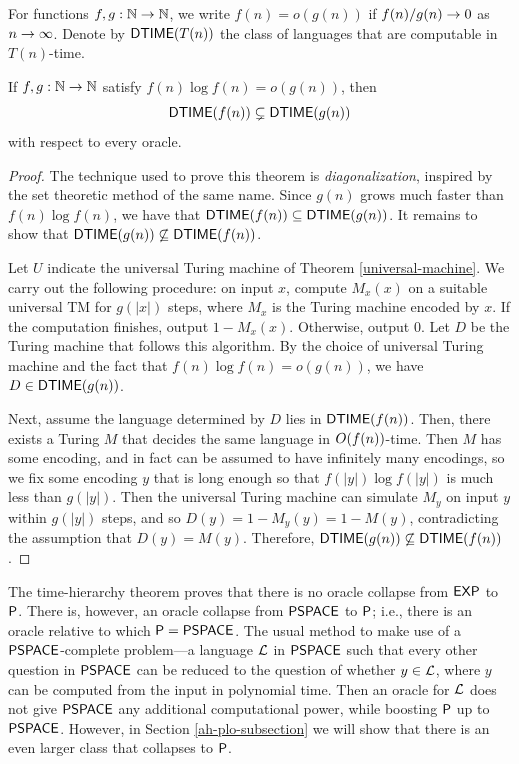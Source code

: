 For functions $f,g:\mathbb{N}\rightarrow\mathbb{N}$, we write $f(n)=o(g(n))$ if $f(n)/g(n)\rightarrow 0$ as 
$n\rightarrow\infty$. Denote by $\mathsf{DTIME}(T(n))$ the class of languages that are 
computable in $T(n)$-time.

\begin{theorem}
If $f,g:\mathbb{N}\rightarrow\mathbb{N}$ satisfy $f(n)\log f(n)=o(g(n))$, then
\[
\mathsf{DTIME}(f(n))\subsetneq\mathsf{DTIME}(g(n))
\]
with respect to every oracle.
\end{theorem}
\begin{proof}
The technique used to prove this theorem is \textit{diagonalization}, inspired by
the set theoretic method of the same name. Since $g(n)$ grows much faster than 
$f(n)\log f(n)$, we have that $\mathsf{DTIME}(f(n))\subseteq\mathsf{DTIME}(g(n))$. It 
remains to show that $\mathsf{DTIME}(g(n))\not\subseteq\mathsf{DTIME}(f(n))$.

Let $U$ indicate the universal Turing machine of Theorem \ref{universal-machine}.
We carry out the following procedure: on input $x$, compute $M_x(x)$ on a 
suitable universal TM for $g(|x|)$ steps, where $M_x$ is the Turing machine 
encoded by $x$. If the computation finishes, output $1-M_x(x)$. Otherwise, output
$0$. Let $D$ be the Turing machine that follows this algorithm. By the choice of 
universal Turing machine and the fact that $f(n)\log f(n)=o(g(n))$, we have 
$D\in\mathsf{DTIME}(g(n))$.

Next, assume the language determined by $D$ lies in  $\mathsf{DTIME}(f(n))$. Then, 
there exists a Turing $M$ that decides the same language in $O(f(n))$-time. Then
$M$ has some encoding, and in fact can be assumed to have infinitely many 
encodings, so we fix some encoding $y$ that is long enough so that $f(|y|)\log 
f(|y|)$ is much less than $g(|y|)$. Then the universal Turing machine can simulate
$M_y$ on input $y$ within $g(|y|)$ steps, and so $D(y)=1-M_y(y)=1-M(y)$, 
contradicting the assumption that $D(y)=M(y)$. Therefore, 
$\mathsf{DTIME}(g(n))\not\subseteq\mathsf{DTIME}(f(n))$.
\end{proof}

The time-hierarchy theorem proves that there is no oracle collapse from 
$\mathsf{EXP}$ to $\mathsf{P}$. There is, however, an oracle collapse from $\mathsf{PSPACE}$ to
$\mathsf{P}$; i.e., there is an oracle relative to which $\mathsf{P}=\mathsf{PSPACE}$. The usual 
method to make use of a $\mathsf{PSPACE}$-complete problem---a language $\mathcal{L}$ in 
$\mathsf{PSPACE}$ such that every other question in $\mathsf{PSPACE}$ can be reduced to 
the question of whether $y\in\mathcal{L}$, where $y$ can be computed from the input in 
polynomial time. Then an oracle for $\mathcal{L}$ does not give $\mathsf{PSPACE}$ any 
additional computational power, while boosting $\mathsf{P}$ up to $\mathsf{PSPACE}$. 
However, in Section \ref{ah-plo-subsection} we will show that 
there is an even larger class that collapses to $\mathsf{P}$.

